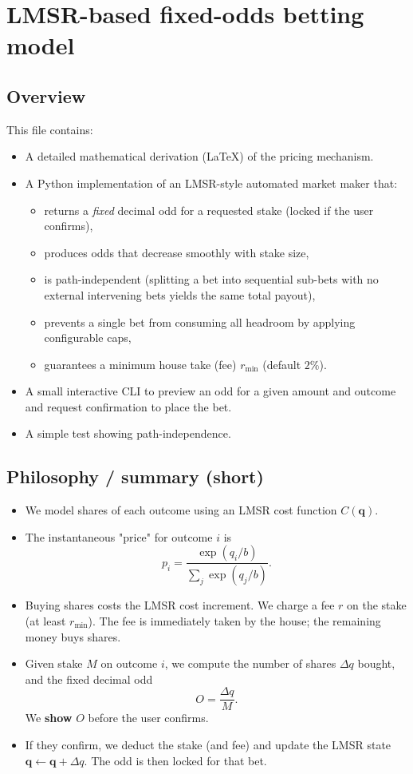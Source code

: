 \documentclass[]{article}
\begin{document}
\section*{LMSR-based fixed-odds betting model}

\subsection*{Overview}
This file contains:
\begin{itemize}
  \item A detailed mathematical derivation (LaTeX) of the pricing mechanism.
  \item A Python implementation of an LMSR-style automated market maker that:
    \begin{itemize}
      \item returns a \emph{fixed} decimal odd for a requested stake (locked if the user confirms),
      \item produces odds that decrease smoothly with stake size,
      \item is path-independent (splitting a bet into sequential sub-bets with no external intervening bets yields the same total payout),
      \item prevents a single bet from consuming all headroom by applying configurable caps,
      \item guarantees a minimum house take (fee) $r_{\min}$ (default $2\%$).
    \end{itemize}
  \item A small interactive CLI to preview an odd for a given amount and outcome and request confirmation to place the bet.
  \item A simple test showing path-independence.
\end{itemize}

\subsection*{Philosophy / summary (short)}
\begin{itemize}
  \item We model shares of each outcome using an LMSR cost function $C(\mathbf{q})$.
  \item The instantaneous "price" for outcome $i$ is
    \[
      p_i = \frac{\exp(q_i/b)}{\sum_j \exp(q_j/b)}.
    \]
  \item Buying shares costs the LMSR cost increment. We charge a fee $r$ on the stake (at least $r_{\min}$). The fee is immediately taken by the house; the remaining money buys shares.
  \item Given stake $M$ on outcome $i$, we compute the number of shares $\Delta q$ bought, and the fixed decimal odd
    \[
      O = \frac{\Delta q}{M}.
    \]
    We \textbf{show} $O$ before the user confirms.
  \item If they confirm, we deduct the stake (and fee) and update the LMSR state $\mathbf{q} \leftarrow \mathbf{q} + \Delta q$. The odd is then locked for that bet.
\end{itemize}
\end{document}
